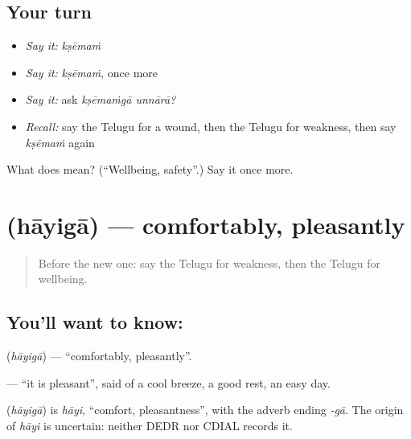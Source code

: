 \subsection*{Your turn}
\begin{itemize}
\raggedright
  \item \emph{Say it:} \emph{kṣēmaṁ}
  \item \emph{Say it:} \emph{kṣēmaṁ}, once more
  \item \emph{Say it:} ask \emph{kṣēmaṁgā unnārā?}
  \item \emph{Recall:} say the Telugu for a wound, then the Telugu for weakness, then say \emph{kṣēmaṁ} again
\end{itemize}

\begin{tcolorbox}[breakable,colback=teal!4,colframe=teal!35!black,title={Before you move on}]
What does  mean? (\textquotedblleft{}Wellbeing, safety\textquotedblright{}.) Say it once more.
\end{tcolorbox}
\section[\texorpdfstring{\te{హాయిగా} (hāyigā)}{హాయిగా (hāyigā)}]{ (hāyigā) — comfortably, pleasantly}

\label{lesson:TE-C93-comfortably}



\begin{quote}
Before the new one: say the Telugu for weakness, then the Telugu for wellbeing.
\end{quote}

\subsection*{You'll want to know: }
\textbf{} (\emph{hāyigā}) — \textquotedblleft{}comfortably, pleasantly\textquotedblright{}.

\textbf{ } — \textquotedblleft{}it is pleasant\textquotedblright{}, said of a cool breeze, a good rest, an easy day.

\begin{cousinweb}
\textbf{} (\emph{hāyigā}) is \emph{hāyi}, \textquotedblleft{}comfort, pleasantness\textquotedblright{}, with the adverb ending \emph{-gā}. The origin of \emph{hāyi} is uncertain: neither DEDR nor CDIAL records it.
\end{cousinweb}

